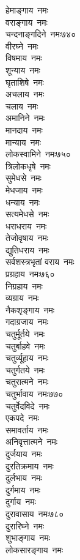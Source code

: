 \begin{multicols}{2}
\begin{flushleft}
हेमाङ्गाय~नमः\\
वराङ्गाय~नमः\\
चन्दनाङ्गदिने~नमः\hfill ७४०\\
वीरघ्ने~नमः\\
विषमाय~नमः\\
शून्याय~नमः\\
घृताशिषे~नमः\\
अचलाय~नमः\\
चलाय~नमः\\
अमानिने~नमः\\
मानदाय~नमः\\
मान्याय~नमः\\
लोकस्वामिने~नमः\hfill ७५०\\
त्रिलोकधृषे~नमः\\
सुमेधसे~नमः\\
मेधजाय~नमः\\
धन्याय~नमः\\
सत्यमेधसे~नमः\\
धराधराय~नमः\\
तेजोवृषाय~नमः\\
द्युतिधराय~नमः\\
सर्वशस्त्रभृतां वराय~नमः\\
प्रग्रहाय~नमः\hfill ७६०\\
निग्रहाय~नमः\\
व्यग्राय~नमः\\
नैकशृङ्गाय~नमः\\
गदाग्रजाय~नमः\\
चतुर्मूर्तये~नमः\\
चतुर्बाहवे~नमः\\
चतुर्व्यूहाय~नमः\\
चतुर्गतये~नमः\\
चतुरात्मने~नमः\\
चतुर्भावाय~नमः\hfill ७७०\\
चतुर्वेदविदे~नमः\\
एकपदे~नमः\\
समावर्ताय~नमः\\
अनिवृत्तात्मने~नमः\\
दुर्जयाय~नमः\\
दुरतिक्रमाय~नमः\\
दुर्लभाय~नमः\\
दुर्गमाय~नमः\\
दुर्गाय~नमः\\
दुरावासाय~नमः\hfill ७८०\\
दुरारिघ्ने~नमः\\
शुभाङ्गाय~नमः\\
लोकसारङ्गाय~नमः\\

\end{flushleft}
\end{multicols}
